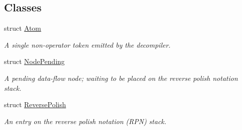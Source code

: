 \subsection*{Classes}
\begin{DoxyCompactItemize}
\item 
struct \mbox{\hyperlink{struct_print_language_1_1_atom}{Atom}}
\begin{DoxyCompactList}\small\item\em A single non-\/operator token emitted by the decompiler. \end{DoxyCompactList}\item 
struct \mbox{\hyperlink{struct_print_language_1_1_node_pending}{Node\+Pending}}
\begin{DoxyCompactList}\small\item\em A pending data-\/flow node; waiting to be placed on the reverse polish notation stack. \end{DoxyCompactList}\item 
struct \mbox{\hyperlink{struct_print_language_1_1_reverse_polish}{Reverse\+Polish}}
\begin{DoxyCompactList}\small\item\em An entry on the reverse polish notation (R\+PN) stack. \end{DoxyCompactList}\end{DoxyCompactItemize}
